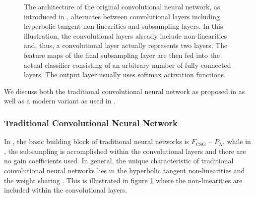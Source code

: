 \begin{figure}[t!]
	\caption[Architecture of a traditional convolutional neural network.]{The architecture of the original convolutional neural network, as introduced in \cite{LeCunBoserDenkerHenderson:1989}, alternates between convolutional layers including hyperbolic tangent non-linearities and subsampling layers. In this illustration, the convolutional layers already include non-linearities and, thus, a convolutional layer actually represents two layers. The feature maps of the final subsampling layer are then fed into the actual classifier consisting of an arbitrary number of fully connected layers. The output layer usually uses softmax activation functions.}
	\label{fig:traditional-convolutional-network}
\end{figure}
We discuss both the traditional convolutional neural network as proposed in \cite{LeCunBoserDenkerHenderson:1989} as well as a modern variant as used in \cite{KrizhevskySutskeverHinton:2012}.

\subsubsection{Traditional Convolutional Neural Network}

In \cite{JarrettKavukcuogluRanzatoLeCun:2009}, the basic building block of traditional neural networks is $F_{\text{CSG}}$ -- $P_{\text{A}}$, while in \cite{LeCunBoserDenkerHenderson:1989}, the subsampling is accomplished within the convolutional layers and there are no gain coefficients used. In general, the unique characteristic of traditional convolutional neural networks lies in the hyperbolic tangent non-linearities and the weight sharing \cite{LeCunBoserDenkerHenderson:1989}. This is illustrated in figure \ref{fig:traditional-convolutional-network} where the non-linearities are included within the convolutional layers.


